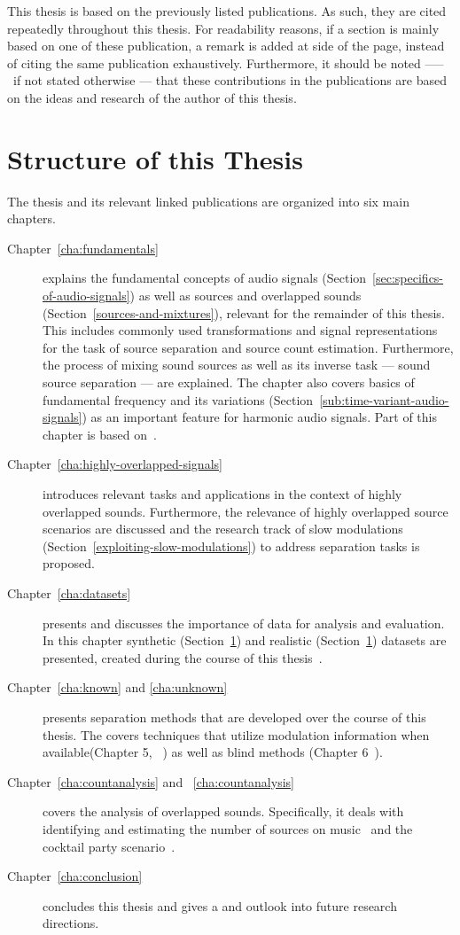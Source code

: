 This thesis is based on the previously listed publications. As such, they are cited repeatedly throughout this thesis. For readability reasons, if a section is mainly based on one of these publication, a remark is added at side of the page, instead of citing the same publication exhaustively. Furthermore, it should be noted ––– if not stated otherwise ---  that these contributions in the publications are based on the ideas and research of the author of this thesis.

\section{Structure of this Thesis}

The thesis and its relevant linked publications are organized into six main chapters.
\begin{description}
  \item[Chapter~\ref{cha:fundamentals}] explains the fundamental concepts of audio signals (Section~\ref{sec:specifics-of-audio-signals}) as well as sources and overlapped sounds (Section~\ref{sources-and-mixtures}), relevant for the remainder of this thesis.
  This includes commonly used transformations and signal representations for the task of source separation and source count estimation.
  Furthermore, the process of mixing sound sources as well as its inverse task --- sound source separation --- are explained.
  The chapter also covers basics of fundamental frequency and its variations (Section~\ref{sub:time-variant-audio-signals}) as an important feature for harmonic audio signals.
  Part of this chapter is based on~\cite{rafii18}.
  \item[Chapter~\ref{cha:highly-overlapped-signals}] introduces relevant tasks and applications in the context of highly overlapped sounds.
  Furthermore, the relevance of highly overlapped source scenarios are discussed and the research track of slow  modulations (Section~\ref{exploiting-slow-modulations}) to address separation tasks is proposed.
  \item[Chapter~\ref{cha:datasets}] presents and discusses the importance of data for analysis and evaluation.
  In this chapter synthetic (Section~\ref{}) and realistic (Section~\ref{}) datasets are presented, created during the course of this thesis~\cite{oss_wice, oss_unison, oss_libricount, stoeter15acm, liutkus17}.
  \item[Chapter~\ref{cha:known} and \ref{cha:unknown}] presents separation methods that are developed over the course of this thesis.
  The covers techniques that utilize modulation information when available(Chapter 5, ~\cite{stoeter14, stoeter15icassp}) as well as blind methods (Chapter 6~\cite{stoeter16, liutkus17}).
  \item[Chapter~\ref{cha:countanalysis} and ~\ref{cha:countanalysis}] covers the analysis of overlapped sounds. Specifically, it deals with identifying and estimating the number of sources on music~\cite{schoeffler13, stoeter13} and the cocktail party scenario~\cite{stoeter19, stoeter18}.
  \item[Chapter~\ref{cha:conclusion}] concludes this thesis and gives a and outlook into future research directions.
\end{description}
